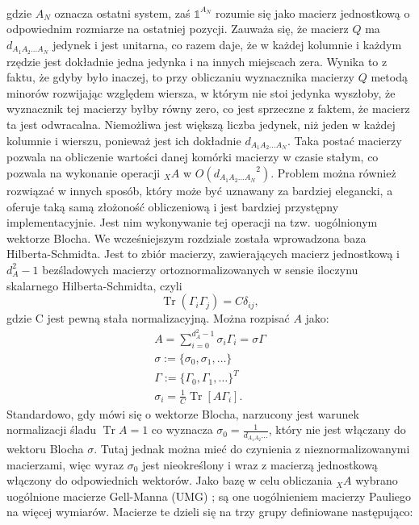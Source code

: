 \documentclass[10pt]{article} %
\DeclareMathOperator{\Trs}{Tr}
\newcommand{\I}{\mathbb{1}}
\begin{document}
\begin{appendices}
\begin{gather}
\end{gather} gdzie $A_N$ oznacza ostatni system, zaś $\I^{A_N}$ rozumie się jako macierz jednostkową o odpowiednim rozmiarze na ostatniej pozycji. Zauważa się, że macierz $Q$ ma $d_{A_1 A_2 \dots A_N}$ jedynek i jest unitarna, co razem daje, że w każdej kolumnie i każdym rzędzie jest dokładnie jedna jedynka i na innych miejscach zera. Wynika to z faktu, że gdyby było inaczej, to przy obliczaniu wyznacznika macierzy $Q$ metodą minorów rozwijając względem wiersza, w którym nie stoi jedynka wyszłoby, że wyznacznik tej macierzy byłby równy zero, co jest sprzeczne z faktem, że macierz ta jest odwracalna. Niemożliwa jest większą liczba jedynek, niż jeden w każdej kolumnie i wierszu, ponieważ jest ich dokładnie $d_{A_1A_2\dots A_N}$. Taka postać macierzy pozwala na obliczenie wartości danej komórki macierzy w czasie stałym, co pozwala na wykonanie operacji ${}_XA$ w $O({d_{A_1 A_2 \dots A_N}}^2)$. Problem można również rozwiązać w innych sposób, który może być uznawany za bardziej elegancki, a oferuje taką samą złożoność obliczeniową i jest bardziej przystępny implementacyjnie. Jest nim wykonywanie tej operacji na tzw. uogólnionym wektorze Blocha. We wcześniejszym rozdziale została wprowadzona baza Hilberta-Schmidta. Jest to zbiór macierzy, zawierających macierz jednostkową i $d_A^2-1$ bezśladowych macierzy ortoznormalizowanych w sensie iloczynu skalarnego Hilberta-Schmidta, czyli
\begin{equation}
\Trs \left( \Gamma_i \Gamma_j \right) = C\delta_{ij},
\end{equation} gdzie C jest pewną stała normalizacyjną.
Można rozpisać $A$ jako:
\begin{gather}
A = \sum_{i=0}^{d^2_A-1} \sigma_i \Gamma_i = \mathbb{\sigma} \Gamma \\
\mathbb{\sigma} := \{ \sigma_0, \sigma_1, \dots \} \\
\Gamma := \{ \Gamma_0, \Gamma_1, \dots \}^T \\
\sigma_i = \frac{1}{C} \Trs \left[ A \Gamma_i \right].
\end{gather} Standardowo, gdy mówi się o wektorze Blocha, narzucony jest warunek normalizacji śladu $\Trs A = 1$ co wyznacza $\sigma_0 = \frac{1}{d_{A_1A_2} \dots}$, który nie jest włączany do wektoru Blocha $\mathbb{\sigma}$. Tutaj jednak można mieć do czynienia z nieznormalizowanymi macierzami, więc
wyraz $\sigma_0$ jest nieokreślony i wraz z macierzą jednostkową włączony do odpowiednich wektorów. Jako bazę w celu obliczania ${}_XA$ wybrano uogólnione macierze Gell-Manna (UMG) \cite{gell_mann}; są one uogólnieniem macierzy Pauliego na więcej wymiarów. Macierze te dzieli się na trzy grupy definiowane następująco:

\end{appendices}
\end{document}
